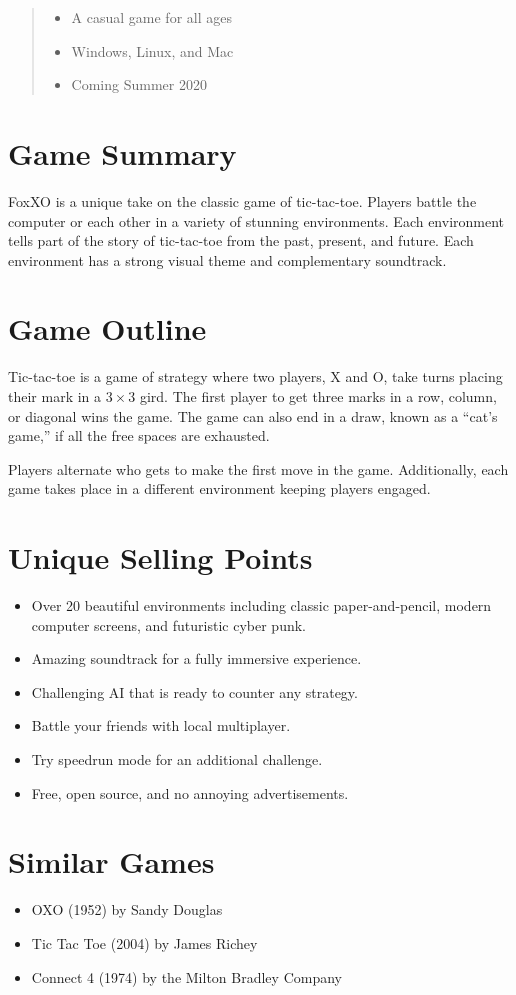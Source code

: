 \documentclass{tufte-handout}
\begin{document}
\begin{abstract}
  \begin{itemize}[noitemsep,label=]
    \item A casual game for all ages
    \item Windows, Linux, and Mac
    \item Coming Summer 2020
  \end{itemize}
\end{abstract}


\section{Game Summary}
FoxXO is a unique take on the classic game of tic-tac-toe. Players battle the
computer or each other in a variety of stunning environments. Each environment
tells part of the story of tic-tac-toe from the past, present, and future. Each
environment has a strong visual theme and complementary soundtrack.


\section{Game Outline}
Tic-tac-toe is a game of strategy where two players, X and O, take turns placing
their mark in a $3\times3$ gird. The first player to get three marks in a row,
column, or diagonal wins the game. The game can also end in a draw, known as a
``cat's game,'' if all the free spaces are exhausted.

Players alternate who gets to make the first move in the game. Additionally,
each game takes place in a different environment keeping players engaged.


\section{Unique Selling Points}
\begin{itemize}[noitemsep]
  \item {
    Over 20 beautiful environments including classic paper-and-pencil, modern
    computer screens, and futuristic cyber punk.
  }
  \item Amazing soundtrack for a fully immersive experience.
  \item Challenging AI that is ready to counter any strategy.
  \item Battle your friends with local multiplayer.
  \item Try speedrun mode for an additional challenge.
  \item Free, open source, and no annoying advertisements.
\end{itemize}


\section{Similar Games}
\begin{itemize}[noitemsep]
  \item OXO (1952) by Sandy Douglas
  \item Tic Tac Toe (2004) by James Richey
  \item Connect 4 (1974) by the Milton Bradley Company
\end{itemize}
\end{document}
